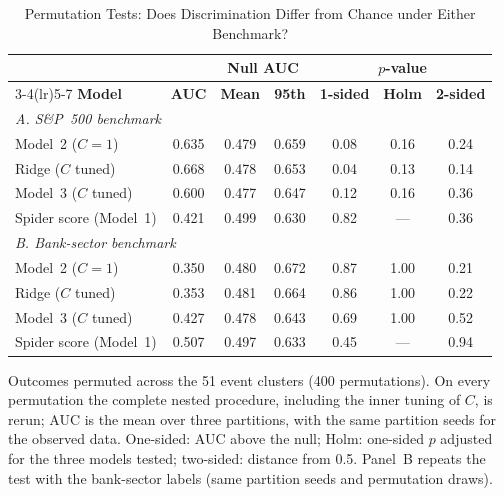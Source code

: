 \begin{table}[!t]
\caption{Permutation Tests: Does Discrimination Differ from Chance under Either Benchmark?}
\label{tab:perm}
\centering
\footnotesize
\setlength{\tabcolsep}{2.5pt}
\begin{tabular}{lcccccc}
\toprule
 & & \multicolumn{2}{c}{\textbf{Null AUC}} & \multicolumn{3}{c}{\textbf{$p$-value}} \\
\cmidrule(lr){3-4}\cmidrule(lr){5-7}
\textbf{Model} & \textbf{AUC} & \textbf{Mean} & \textbf{95th} & \textbf{1-sided} & \textbf{Holm} & \textbf{2-sided} \\
\midrule
\multicolumn{7}{l}{\textit{A. S\&P~500 benchmark}} \\
Model~2 ($C=1$) & 0.635 & 0.479 & 0.659 & 0.08 & 0.16 & 0.24 \\
Ridge ($C$ tuned) & 0.668 & 0.478 & 0.653 & 0.04 & 0.13 & 0.14 \\
Model~3 ($C$ tuned) & 0.600 & 0.477 & 0.647 & 0.12 & 0.16 & 0.36 \\
Spider score (Model~1) & 0.421 & 0.499 & 0.630 & 0.82 & --- & 0.36 \\
\midrule
\multicolumn{7}{l}{\textit{B. Bank-sector benchmark}} \\
Model~2 ($C=1$) & 0.350 & 0.480 & 0.672 & 0.87 & 1.00 & 0.21 \\
Ridge ($C$ tuned) & 0.353 & 0.481 & 0.664 & 0.86 & 1.00 & 0.22 \\
Model~3 ($C$ tuned) & 0.427 & 0.478 & 0.643 & 0.69 & 1.00 & 0.52 \\
Spider score (Model~1) & 0.507 & 0.497 & 0.633 & 0.45 & --- & 0.94 \\
\bottomrule
\end{tabular}
\par\vspace{2pt}\parbox{0.94\columnwidth}{\scriptsize Outcomes permuted across the 51 event clusters (400 permutations). On every
permutation the complete nested procedure, including the inner tuning of $C$, is rerun; AUC is the mean over three
partitions, with the same partition seeds for the observed data. One-sided: AUC above the null; Holm: one-sided
$p$ adjusted for the three models tested; two-sided: distance from 0.5. Panel~B repeats the test with the bank-sector labels
(same partition seeds and permutation draws).}
\end{table}
